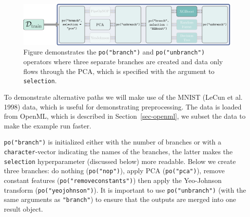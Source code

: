 \begin{figure}

{\centering \includegraphics[width=1\textwidth,height=\textheight]{chapters/chapter8/Figures/mlr3book_figures-24.png}

}

\caption{\label{fig-pipelines-branching}Figure demonstrates the
\texttt{po("branch")} and \texttt{po("unbranch")} operators where three
separate branches are created and data only flows through the PCA, which
is specified with the argument to \texttt{selection}.}

\end{figure}

To demonstrate alternative paths we will make use of the MNIST (LeCun et
al. 1998) data, which is useful for demonstrating preprocessing. The
data is loaded from OpenML, which is described in
Section~\ref{sec-openml}, we subset the data to make the example run
faster.

\begin{Shaded}
\begin{Highlighting}[]
\OtherTok{=} \NormalTok{(} \NormalTok{)}
\OtherTok{=} \SpecialCharTok{$}
  \NormalTok{(}\NormalTok{(}\NormalTok{, }\NormalTok{))}\SpecialCharTok{$}
  \SpecialCharTok{$}\NormalTok{feature\_names[}\NormalTok{(}\NormalTok{, }\NormalTok{)])}
\end{Highlighting}
\end{Shaded}

\texttt{po("branch")} is initialized either with the number of branches
or with a \texttt{character}-vector indicating the names of the
branches, the latter makes the \texttt{selection} hyperparameter
(discussed below) more readable. Below we create three branches: do
nothing (\texttt{po("nop")}), apply PCA (\texttt{po("pca")}), remove
constant features (\texttt{po("removeconstants")}) then apply the
Yeo-Johnson transform (\texttt{po("yeojohnson")}). It
is important to use \texttt{po("unbranch")} (with the same arguments as
\texttt{"branch"}) to ensure that the outputs are merged into one result
object.

